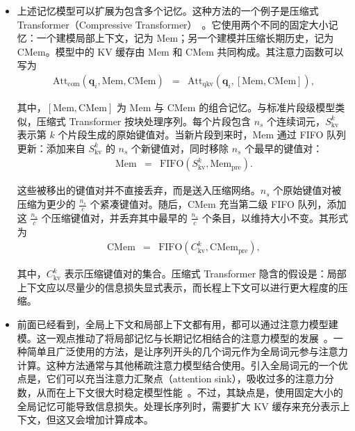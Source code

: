 \begin{itemize}
    \noindent 考虑一个包含两个片段的记忆，其中一个是当前片段，另一个是前一片段。在注意力运算中，每个位置都可以访问最近两个连续片段中的历史键值对。尽管概念简单，这种滑动分块局部记忆及其变体，已广泛用于片段级循环架构~\cite{dai-etal:2019transformer,hutchins-etal:2022block,bulatov-etal:2022recurrent}。

\item \vspace{0.3em} 上述记忆模型可以扩展为包含多个记忆。这种方法的一个例子是压缩式 Transformer（Compressive Transformer）~\cite{rae-etal:2020:compressive}。它使用两个不同的固定大小记忆：一个建模局部上下文，记为 $\mathrm{Mem}$；另一个建模并压缩长期历史，记为 $\mathrm{CMem}$。模型中的 KV 缓存由 $\mathrm{Mem}$ 和 $\mathrm{CMem}$ 共同构成。其注意力函数可以写为
    \begin{eqnarray}
    \mathrm{Att}_{\mathrm{com}}(\mathbf{q}_i,\mathrm{Mem},\mathrm{CMem}) & = & \mathrm{Att}_{\mathrm{qkv}}(\mathbf{q}_i, [\mathrm{Mem},\mathrm{CMem}]),
    \end{eqnarray}

    \noindent 其中，$[\mathrm{Mem},\mathrm{CMem}]$ 为 $\mathrm{Mem}$ 与 $\mathrm{CMem}$ 的组合记忆。与标准片段级模型类似，压缩式 Transformer 按块处理序列。每个片段包含 $n_s$ 个连续词元，$S_{\mathrm{kv}}^{k}$ 表示第 $k$ 个片段生成的原始键值对。当新片段到来时，$\mathrm{Mem}$ 通过 FIFO 队列更新：添加来自 $S_{\mathrm{kv}}^{k}$ 的 $n_s$ 个新键值对，同时移除 $n_s$ 个最早的键值对：
    \begin{eqnarray}
    \mathrm{Mem} & = & \mathrm{FIFO}(S_{\mathrm{kv}}^{k}, \mathrm{Mem}_{\mathrm{pre}}).
    \end{eqnarray}

    \noindent 这些被移出的键值对并不直接丢弃，而是送入压缩网络。$n_s$ 个原始键值对被压缩为更少的 $\frac{n_s}{c}$ 个紧凑键值对。随后，$\mathrm{CMem}$ 充当第二级 FIFO 队列，添加这 $\frac{n_s}{c}$ 个压缩键值对，并丢弃其中最早的 $\frac{n_s}{c}$ 个条目，以维持大小不变。其形式为
    \begin{eqnarray}
    \mathrm{CMem}& = & \mathrm{FIFO}(C_{\mathrm{kv}}^{k}, \mathrm{CMem}_{\mathrm{pre}}),
    \end{eqnarray}

    \noindent 其中，$C_{\mathrm{kv}}^{k}$ 表示压缩键值对的集合。压缩式 Transformer 隐含的假设是：局部上下文应以尽量少的信息损失显式表示，而长程上下文可以进行更大程度的压缩。

\item \vspace{0.3em} 前面已经看到，全局上下文和局部上下文都有用，都可以通过注意力模型建模。这一观点推动了将局部记忆与长期记忆相结合的注意力模型的发展~\cite{ainslie-etal:2020etc,zaheer-etal:2020big,gupta-berant:2020gmat}。一种简单且广泛使用的方法，是让序列开头的几个词元作为全局词元参与注意力计算。这种方法通常与其他稀疏注意力模型结合使用。引入全局词元的一个优点是，它们可以充当注意力汇聚点（attention sink），吸收过多的注意力分数，从而在上下文很大时稳定模型性能~\cite{xiao-etal:2024efficient}。不过，其缺点是，使用固定大小的全局记忆可能导致信息损失。处理长序列时，需要扩大 KV 缓存来充分表示上下文，但这又会增加计算成本。

\end{itemize}
\vspace{0.5em}

